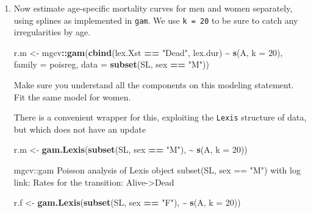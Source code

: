 \documentclass[
]{book}
\newenvironment{Shaded}{\begin{snugshade}}{\end{snugshade}}
\newcommand{\AttributeTok}[1]{\textcolor[rgb]{0.13,0.29,0.53}{#1}}
\newcommand{\DecValTok}[1]{\textcolor[rgb]{0.00,0.00,0.81}{#1}}
\newcommand{\FunctionTok}[1]{\textcolor[rgb]{0.13,0.29,0.53}{\textbf{#1}}}
\newcommand{\NormalTok}[1]{#1}
\newcommand{\OtherTok}[1]{\textcolor[rgb]{0.56,0.35,0.01}{#1}}
\newcommand{\SpecialCharTok}[1]{\textcolor[rgb]{0.81,0.36,0.00}{\textbf{#1}}}
\newcommand{\StringTok}[1]{\textcolor[rgb]{0.31,0.60,0.02}{#1}}
\begin{document}
\begin{enumerate}
\def\labelenumi{\arabic{enumi}.}
\item
  Now estimate age-specific mortality curves for men and
  women separately, using splines as implemented in \texttt{gam}.
  We use \texttt{k\ =\ 20} to be sure to catch any irregularities by age.

\begin{Shaded}
\begin{Highlighting}[]
\NormalTok{r.m }\OtherTok{\textless{}{-}}\NormalTok{ mgcv}\SpecialCharTok{::}\FunctionTok{gam}\NormalTok{(}\FunctionTok{cbind}\NormalTok{(lex.Xst }\SpecialCharTok{==} \StringTok{"Dead"}\NormalTok{, lex.dur) }\SpecialCharTok{\textasciitilde{}} \FunctionTok{s}\NormalTok{(A, }\AttributeTok{k =} \DecValTok{20}\NormalTok{),}
                 \AttributeTok{family =}\NormalTok{ poisreg,}
                   \AttributeTok{data =} \FunctionTok{subset}\NormalTok{(SL, sex }\SpecialCharTok{==} \StringTok{"M"}\NormalTok{))}
\end{Highlighting}
\end{Shaded}

  Make sure you understand all the components on this modeling statement.
  Fit the same model for women.

  There is a convenient wrapper for this, exploiting the \texttt{Lexis}
  structure of data, but which does not have an update

\begin{Shaded}
\begin{Highlighting}[]
\NormalTok{r.m }\OtherTok{\textless{}{-}} \FunctionTok{gam.Lexis}\NormalTok{(}\FunctionTok{subset}\NormalTok{(SL, sex }\SpecialCharTok{==} \StringTok{"M"}\NormalTok{), }\SpecialCharTok{\textasciitilde{}} \FunctionTok{s}\NormalTok{(A, }\AttributeTok{k =} \DecValTok{20}\NormalTok{))}
\end{Highlighting}
\end{Shaded}

\begin{Shaded}
\begin{Highlighting}[]
\NormalTok{mgcv::gam Poisson analysis of Lexis object subset(SL, sex == "M") with log link:}
\NormalTok{Rates for the transition:}
\NormalTok{Alive{-}\textgreater{}Dead}
\end{Highlighting}
\end{Shaded}

\begin{Shaded}
\begin{Highlighting}[]
\NormalTok{r.f }\OtherTok{\textless{}{-}} \FunctionTok{gam.Lexis}\NormalTok{(}\FunctionTok{subset}\NormalTok{(SL, sex }\SpecialCharTok{==} \StringTok{"F"}\NormalTok{), }\SpecialCharTok{\textasciitilde{}} \FunctionTok{s}\NormalTok{(A, }\AttributeTok{k =} \DecValTok{20}\NormalTok{))}
\end{Highlighting}
\end{Shaded}


\end{enumerate}
\end{document}

